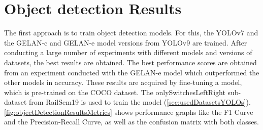 \section{Object detection Results}
\label{sec:objectDetectionResults}

The first approach is to train object detection models.
For this, the \ac{YOLO}v7 and the \ac{GELAN}-c and \ac{GELAN}-e model versions from \ac{YOLO}v9 are trained.
After conducting a large number of experiments with different models and versions of datasets, the best results are obtained.
The best performance scores are obtained from an experiment conducted with the \ac{GELAN}-e model which outperformed the other models in accuracy.
These results are acquired by fine-tuning a model, which is pre-trained on the COCO dataset.
The onlySwitchesLeftRight sub-dataset from RailSem19 is used to train the model (\autoref{sec:usedDatasetsYOLOs}).
\autoref{fig:objectDetectionResultsMetrics} shows performance graphs like the F1 Curve and the Precision-Recall Curve, as well as the confusion matrix with both classes.

